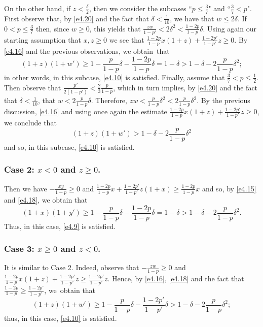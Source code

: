 \documentclass[10pt,a4paper]{amsart}
\theoremstyle{remark}
\newcommand{\meg}{\geqslant}
\newcommand{\mik}{\leqslant}
\begin{document}
On the other hand, if $z<\frac{\delta}{2}$,
then we consider the subcases ``$p\mik \frac37$" and ``$\frac37<p$"\!.
First observe that, by \eqref{e4.20} and the fact that $\delta<\frac{1}{10}$, we have that $w\mik 2\delta$.
If $0<p\mik \frac{3}{7}$ then, since $w\meg 0$, this yields that
$\frac{zw}{1-p'}<2\delta^2<\frac{1-2p}{1-p}\delta$. Using again our starting assumption that
$x,z\meg 0$ we see that $\frac{1-2p}{1-p}x(1+z)+\frac{1-2p'}{1-p'}z\meg 0$. By \eqref{e4.16} and the previous
observations, we obtain~that
\begin{equation} \label{e4.24}
(1+z)(1+w')\meg 1-\frac{p}{1-p}\delta-\frac{1-2p}{1-p}\delta=
1-\delta>1-\delta-2\frac{p}{1-p}\delta^2;
\end{equation}
in other words, in this subcase, \eqref{e4.10} is satisfied. Finally, assume that $\frac37<p\mik \frac12$.
Then observe that $\frac{p'}{2(1-p')}<\frac{2}{3}\frac{p}{1-p}$, which in turn implies,
by \eqref{e4.20} and the fact that $\delta<\frac{1}{10}$, that $w< 2\frac{p}{1-p}\delta$.
Therefore, $zw<\frac{p}{1-p}\delta^2<2\frac{p}{1-p}\delta^2$. By the previous discussion,
\eqref{e4.16} and using once again the estimate $\frac{1-2p}{1-p}x(1+z)+\frac{1-2p'}{1-p'}z\meg 0$, we conclude that
\begin{equation} \label{e4.25}
(1+z)(1+w') > 1-\delta-2\frac{p}{1-p}\delta^2
\end{equation}
and so, in this subcase, \eqref{e4.10} is satisfied.

\subsubsection*{Case 2: $x<0$ and $z\meg 0$.} Then we have
$-\frac{xy}{1-p}\meg 0$ and $\frac{1-2p}{1-p}x+\frac{1-2p'}{1-p'}z(1+x)\meg \frac{1-2p}{1-p}x$
and so, by \eqref{e4.15} and \eqref{e4.18}, we obtain that
\begin{equation} \label{e4.26}
(1+x)(1+y')\meg 1-\frac{p}{1-p}\delta-\frac{1-2p}{1-p}\delta =
1-\delta>1-\delta-2\frac{p}{1-p}\delta^2.
\end{equation}
Thus, in this case, \eqref{e4.9} is satisfied.

\subsubsection*{Case 3: $x\meg 0$ and $z<0$.} It is similar to Case 2.
Indeed, observe that $-\frac{zw}{1-p}\meg 0$ and
$\frac{1-2p}{1-p}x(1+z)+\frac{1-2p'}{1-p'}z\meg \frac{1-2p'}{1-p'}z$.
Hence, by \eqref{e4.16}, \eqref{e4.18} and the fact that $\frac{1-2p}{1-p}\meg\frac{1-2p'}{1-p'}$,
we~obtain that
\begin{equation} \label{e4.27}
(1+z)(1+w')\meg 1-\frac{p}{1-p}\delta-\frac{1-2p'}{1-p'}\delta >1-\delta-2\frac{p}{1-p}\delta^2;
\end{equation}
thus, in this case, \eqref{e4.10} is satisfied.
\end{document}
